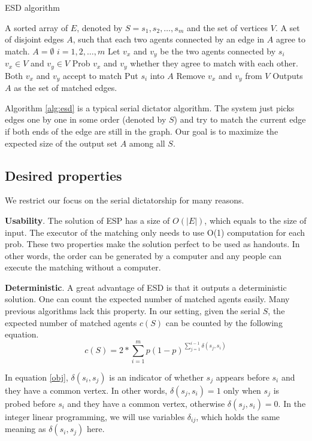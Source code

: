 \documentclass[letterpaper]{article}
\begin{document}
\begin{algorithm}
	\caption{ESD algorithm}
	\label{alg:esd}
	\begin{algorithmic}[1]
		\Require
		A sorted array of $E$, denoted by $S=s_1,s_2,\ldots,s_m$ and the set of vertices $V$.
		\Ensure A set of disjoint edges $A$, such that each two agents connected by an edge in $A$ agree to match. 
		\State $A=\emptyset$
		\For $i=1,2,\ldots,m$
		\State Let $v_x$ and $v_y$ be the two agents connected by $s_i$
		\If $v_x\in V$ and $v_y\in V$
		\State Prob $v_x$ and $v_y$ whether they agree to match with each other.
		\If Both $v_x$ and $v_y$ accept to match
		\State Put $s_i$ into $A$
		\State Remove $v_x$ and $v_y$ from $V$
		\EndIf
		\EndIf
		\EndFor
		\State Outputs $A$ as the set of matched edges.
	\end{algorithmic}
\end{algorithm}

Algorithm \ref{alg:esd} is a typical serial dictator algorithm. 
The system just picks edges one by one in some order (denoted by $S$) and try to match the current edge if both ends of the edge are still in the graph. 
Our goal is to maximize the expected size of the output set $A$ among all $S$.

\subsection{Desired properties}

We restrict our focus on the serial dictatorship for many reasons.

\textbf{Usability}. The solution of ESP has a size of $O(|E|)$, which equals to the size of input. The executor of the matching only needs to use O(1) computation for each prob. These two properties make the solution perfect to be used as handouts. In other words, the order can be generated by a computer and any people can execute the matching without a computer.

\textbf{Deterministic}. A great advantage of ESD is that it outputs a deterministic solution. One can count the expected number of matched agents easily. 
Many previous algorithms lack this property.
In our setting, given the serial $S$, the expected number of matched agents $c(S)$ can be counted by the following equation.
\begin{equation}\label{obj}
c(S)=2*\sum_{i=1}^m p(1-p)^{\sum_{j=1}^{i-1}\delta(s_j,s_i)}
\end{equation}

In equation \ref{obj}, $\delta(s_i,s_j)$ is an indicator of whether $s_j$ appears before $s_i$ and they have a common vertex. In other words, $\delta(s_j,s_i)=1$ only when $s_j$ is probed before $s_i$ and they have a common vertex, otherwise  $\delta(s_j,s_i)=0$. 
In the integer linear programming, we will use variables $\delta_{ij}$, which holds the same meaning as $\delta(s_i,s_j)$ here.
\end{document}
